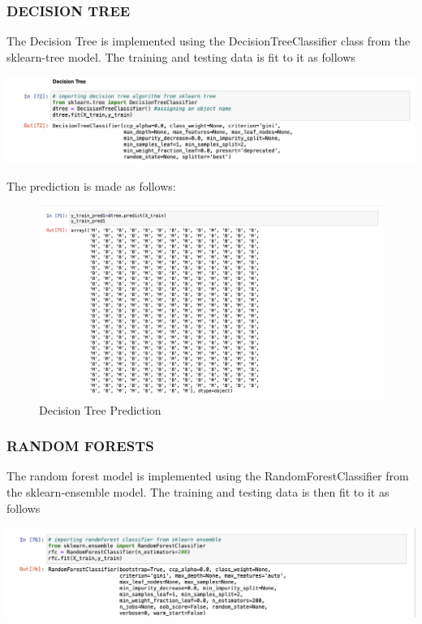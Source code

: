 \documentclass[12pt]{article}
\begin{document}
\subsubsection{\textbf{DECISION TREE }}
The Decision Tree is implemented using the DecisionTreeClassifier class from the sklearn-tree model. The training and testing data is fit to it as follows 

\begin{center}
\centerline{\includegraphics[scale=.4]{dt.png}}
\end{center}

The prediction is made as follows:

\begin{center}
\begin{figure}[h]
\centerline{\includegraphics[scale=.4]{dtreepred.png}}
\caption{Decision Tree Prediction}
\end{figure}
\end{center}
\newpage 

\subsubsection{\textbf{RANDOM FORESTS }}
The random forest model is implemented using the RandomForestClassifier from the sklearn-ensemble model. The training and testing data is then fit to it as follows

\begin{center}
\centerline{\includegraphics[scale=.4]{rf.png}}
\end{center}
\end{document}

